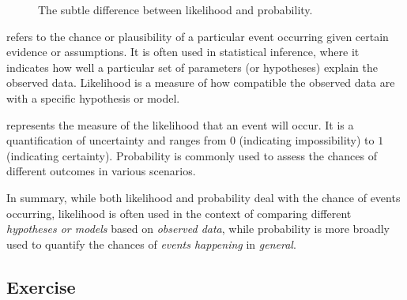 \documentclass[
  a4paper,
]{scrbook}
\providecommand{\tightlist}{%
  \setlength{\itemsep}{0pt}\setlength{\parskip}{0pt}}\usepackage{longtable,booktabs,array}
\let\olddescription\description
\let\endolddescription\enddescription
\renewenvironment{description}{
          \begin{spacing}{1.5}\olddescription
        }{
          \endolddescription\end{spacing}
        }
\begin{document}
\begin{figure}[ht]


\caption{\label{fig-lp}The subtle difference between likelihood and
probability.}

\end{figure}%

\begin{description}
\tightlist
\item[Likelihood]
refers to the chance or plausibility of a particular event occurring
given certain evidence or assumptions. It is often used in statistical
inference, where it indicates how well a particular set of parameters
(or hypotheses) explain the observed data. Likelihood is a measure of
how compatible the observed data are with a specific hypothesis or
model.
\item[Probability]
represents the measure of the likelihood that an event will occur. It is
a quantification of uncertainty and ranges from \(0\) (indicating
impossibility) to \(1\) (indicating certainty). Probability is commonly
used to assess the chances of different outcomes in various scenarios.
\end{description}

In summary, while both likelihood and probability deal with the chance
of events occurring, likelihood is often used in the context of
comparing different \emph{hypotheses or models} based on \emph{observed
data}, while probability is more broadly used to quantify the chances of
\emph{events happening} in \emph{general}.

\subsection{Exercise}\label{exercise-1}
\end{document}
